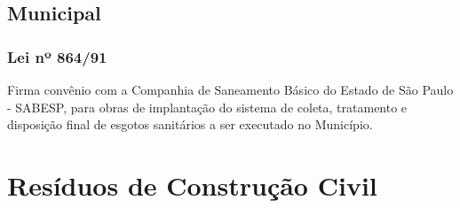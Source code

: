 \begin{subapend}
	\subsection{Municipal}
	\begin{subsubapend}
		\item \subsubsection{Lei nº 864/91}
		Firma convênio com a Companhia de Saneamento Básico do Estado de São Paulo - SABESP, para obras de implantação do sistema de coleta, tratamento e disposição final de esgotos sanitários a ser executado no Município.
	\end{subsubapend}
\end{subapend}



\section{Resíduos de Construção Civil}
